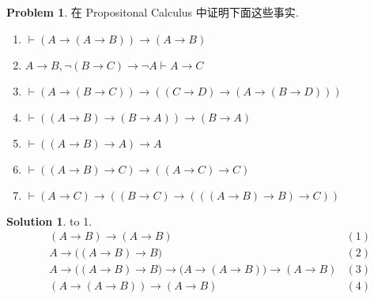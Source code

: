 \documentclass[12pt, a4paper]{ctexart} %
\theoremstyle{plain}
\theoremstyle{definition}
\newtheorem*{comment}{Comment}
\newtheorem{problem}{Problem}
\newtheorem*{solution}{Solution}
\begin{document}
\begin{problem}
    在 Propositonal Calculus 中证明下面这些事实.
    \begin{enumerate}
        \item $\vdash  \left(A \to  \left(A \to B \right)\right) \to \left(A \to B \right)$ 
        \item $A \to B , \neg \left( B \to C \right) \to \neg  A \vdash A \to C$ 
        \item $\vdash \left(A \to \left(B \to C\right) \right) \to ((C \to D)\to (A \to  ( B \to D   )))$
        \item $\vdash \left( \left(A \to B \right) \to \left( B \to A\right) \right) \to \left(B \to A\right)$
        \item $\vdash \left( \left(A \to B \right) \to A    \right) \to A $
        \item $\vdash \left( \left(A \to B \right) \to C\right) \to \left( \left(A \to C\right) \to C    \right) $ 
        \item $\vdash \left(A \to C\right) \to \left(\left(B \to C\right) \to \left(\left(\left(A \to B\right) \to B    \right) \to C    \right)\right)$
    \end{enumerate}
\end{problem}
\begin{comment}
    形如 $A \to  B \to C \to D$ 的式子, 默认从右往左加括号, viz. 原本这个式子应为
    \begin{align*}
        A \to \left(B \to \left(C \to D\right)\right) 
    \end{align*}
\end{comment}
\begin{solution} to 1. 
    \begin{align}
        &\left(A  \to B\right) \to \left(A \to B \right)                                  \tag{thm 1} & (1) \\
        &A \to \big(  \left(A \to B\right) \to B    \big)                                 \tag{前件互换, thm 8} & (2) \\
        &A \to \big( \left(A \to B \right) \to B    \big) \to \big( A \to \left(A \to B\right) \big) \to \left(A \to B\right) \tag{A2}& \left(3\right) \\
        &\left(A \to \left(A \to B\right) \right) \to \left(A \to B\right) \tag{(2) (3) thm 8} & \left(4\right)
    \end{align}
\end{solution}
\end{document}
